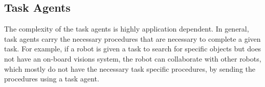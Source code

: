     \subsection{Task Agents}
      The complexity of the task agents is highly application dependent.
      In general, task agents carry the necessary procedures that are necessary
        to complete a given task.
      For example, if a robot is given a task to search for specific objects
        but does not have an on-board visions system, the robot can collaborate
        with other robots, which mostly do not have the necessary task specific
        procedures, by sending the procedures using a task agent.

